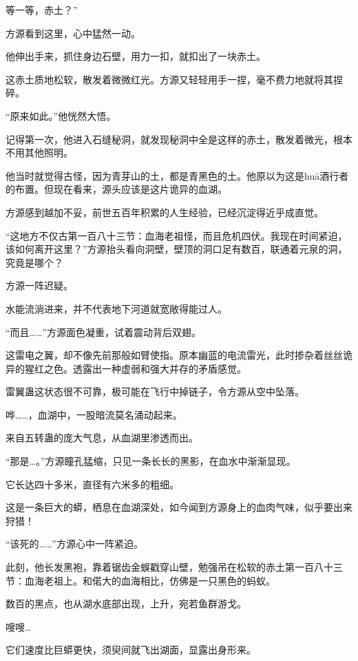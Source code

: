 
\begin{this_body}

等一等，赤土？”

方源看到这里，心中猛然一动。

他伸出手来，抓住身边石壁，用力一扣，就扣出了一块赤土。

这赤土质地松软，散发着微微红光。方源又轻轻用手一捏，毫不费力地就将其捏碎。

“原来如此。”他恍然大悟。

记得第一次，他进入石缝秘洞，就发现秘洞中全是这样的赤土，散发着微光，根本不用其他照明。

他当时就觉得古怪，因为青芽山的土，都是青黑色的土。他原以为这是huā酒行者的布置。但现在看来，源头应该是这片诡异的血湖。

方源感到越加不妥，前世五百年积累的人生经验，已经沉淀得近乎成直觉。

“这地方不仅古第一百八十三节：血海老祖怪，而且危机四伏。我现在时间紧迫，该如何离开这里？”方源抬头看向洞壁，壁顶的洞口足有数百，联通着元泉的洞，究竟是哪个？

方源一阵迟疑。

水能流淌进来，并不代表地下河道就宽敞得能过人。

“而且……”方源面色凝重，试着震动背后双翅。

这雷电之翼，却不像先前那般如臂使指。原本幽蓝的电流雷光，此时掺杂着丝丝诡异的猩红之色。透露出一种虚弱和强大并存的矛盾感觉。

雷翼蛊这状态很不可靠，极可能在飞行中掉链子，令方源从空中坠落。

哗……，血湖中，一股暗流莫名涌动起来。

来自五转蛊的庞大气息，从血湖里渗透而出。

“那是…。”方源瞳孔猛缩，只见一条长长的黑影，在血水中渐渐显现。

它长达四十多米，直径有六米多的粗细。

这是一条巨大的蟒，栖息在血湖深处，如今闻到方源身上的血肉气味，似乎要出来狩猎！

“该死的……”方源心中一阵紧迫。

此刻，他长发黑袍，靠着锯齿金蜈戳穿山壁，勉强吊在松软的赤土第一百八十三节：血海老祖上。和偌大的血海相比，仿佛是一只黑色的蚂蚁。

数百的黑点，也从湖水底部出现，上升，宛若鱼群游戈。

嗖嗖…

它们速度比巨蟒更快，须臾间就飞出湖面，显露出身形来。


\end{this_body}
